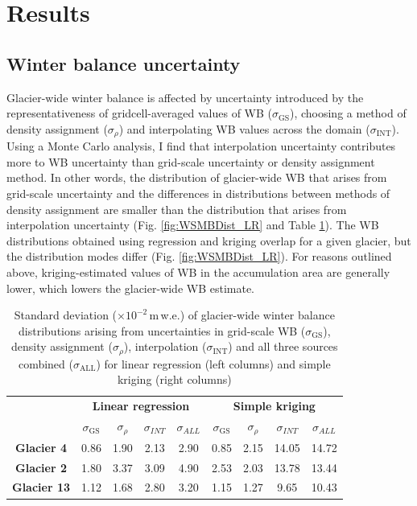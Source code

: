 \documentclass{sfuthesis}
\begin{document}
\section{Results}
\label{sec:Unc_results}

\subsection{Winter balance uncertainty}

Glacier-wide winter balance is affected by uncertainty introduced by the representativeness of gridcell-averaged values of WB ($\sigma_{\mathrm{GS}}$), choosing a method of density assignment ($\sigma_{\rho}$) and interpolating WB values across the domain ($\sigma_{\mathrm{INT}}$). Using a Monte Carlo analysis, I find that interpolation uncertainty contributes more to WB uncertainty than grid-scale uncertainty or density assignment method. In other words, the distribution of glacier-wide WB that arises from grid-scale uncertainty and the differences in distributions between methods of density assignment are smaller than the distribution that arises from interpolation uncertainty (Fig. \ref{fig:WSMBDist_LR} and Table \ref{tab:WSMBdistribution_sigma}). The WB distributions obtained using regression and kriging overlap for a given glacier, but the distribution modes differ (Fig. \ref{fig:WSMBDist_LR}). For reasons outlined above, kriging-estimated values of WB in the accumulation area are generally lower, which lowers the glacier-wide WB estimate. 

 \begin{table}[]
\centering
\caption{Standard deviation ($\times10^{-2}$\,m\,w.e.) of glacier-wide winter balance distributions arising from uncertainties in grid-scale WB ($\sigma_{\mathrm{GS}}$), density assignment ($\sigma_{\rho}$), interpolation ($\sigma_{\mathrm{INT}}$) and all three sources combined ($\sigma_{\mathrm{ALL}}$) for linear regression (left columns) and simple kriging (right columns)}
\label{tab:WSMBdistribution_sigma}
\begin{tabular}{c|cccc|cccc}
 & \multicolumn{4}{c|}{\textbf{Linear regression}} & \multicolumn{4}{c}{\textbf{Simple kriging}} \\
\textbf{} & $\sigma_{\mathrm{GS}}$ & $\sigma_{\rho}$ & $\sigma_{INT}$ & $\sigma_{ALL}$ & $\sigma_{\mathrm{GS}}$ & $\sigma_{\rho}$ & $\sigma_{INT}$ & $\sigma_{ALL}$ \\ \hline
\textbf{Glacier 4} & 0.86 & 1.90 & 2.13 & 2.90 & 0.85 & 2.15 & 14.05 & 14.72 \\
\textbf{Glacier 2} & 1.80 & 3.37 & 3.09 & 4.90 & 2.53 & 2.03 & 13.78 & 13.44 \\
\textbf{Glacier 13} & 1.12 & 1.68 & 2.80 & 3.20 & 1.15 & 1.27 & 9.65 & 10.43
\end{tabular}
\end{table}
\end{document}
